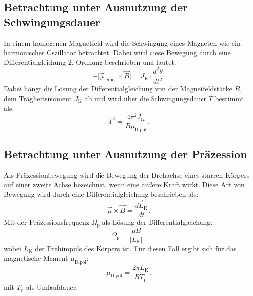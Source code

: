 \subsection{Betrachtung unter Ausnutzung der Schwingungsdauer}
In einem homogenen Magnetfeld wird die Schwingung eines Magneten wie ein harmonischer Oszillator betrachtet. Dabei wird diese Bewegung durch eine Differentialgleichung $2$. Ordnung beschrieben und lautet:
\begin{equation*}
-\vert\vec{\mu}_{\text{Dipol}}\times\vec{B}\vert = J_{\text{K}} \cdot \frac{d^{2}\theta}{dt^{2}}.
\end{equation*} 
Dabei hängt die Lösung der Differentialgleichung von der Magnetfeldstärke $B$, dem Trägheitsmoment $J_{\text{K}}$ ab und wird über die Schwingungsdauer $T$ bestimmt als:
\begin{equation}
T^{2}=\frac{4\pi^{2}J_{\text{K}}}{B\mu_{\text{Dipol}}}.
\label{eq:Schwingungsdauer}
\end{equation}

\subsection{Betrachtung unter Ausnutzung der Präzession}
Als Präzessionbewegung wird die Bewegung der Drehachse eines starren Körpers auf einer zweite Achse bezeichnet, wenn eine äußere Kraft wirkt. Diese Art von Bewegung wird durch eine Differentialgleichung beschrieben als:
\begin{equation*}
\vec{\mu} \times \vec{B} = \frac{d\vec{L}_{\text{K}}}{dt}.
\end{equation*}  
Mit der Präzessionsfrequenz $\Omega_{\text{p}}$ als Lösung der Differentialgleichung:
\begin{equation*}
\Omega_{\text{p}}=\frac{\mu B}{\vert L_{\text{K}} \vert}{,}
\end{equation*}
wobei $L_{\text{K}}$ der Drehimpuls des Körpers ist.
Für diesen Fall ergibt sich für das magnetische Moment $\mu_{\text{Dipol}}$:
\begin{equation}
\mu_{\text{Dipol}}=\frac{2\pi L_{\text{K}}}{BT_{\text{p}}}.
\label{eq:Praezession}
\end{equation}
mit $T_{\text{p}}$ als Umlaufdauer.
